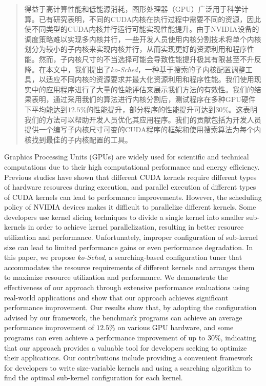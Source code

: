 

\begin{abstract}
  得益于高计算性能和低能源消耗，图形处理器（GPU）广泛用于科学计算。已有研究表明，不同的CUDA内核在执行过程中需要不同的资源，因此使不同类型的CUDA内核并行运行可能实现性能提升。由于NVIDIA设备的调度策略难以实现多内核并行，一些开发人员使用内核分割技术将单个内核划分为较小的子内核来实现内核并行，从而实现更好的资源利用和程序性能。然而，子内核尺寸的不当选择可能会导致性能提升极其有限甚至不升反降。在本文中，我们提出了\emph{ko-Sched}，一种基于搜索的子内核配置调整工具，以适应不同内核的资源要求并最大化资源利用和程序性能。我们使用现实中的应用程序进行了大量的性能评估来展示我们方法的有效性。我们的结果表明，通过采用我们的算法进行内核分割后，测试程序在多种GPU硬件下平均能达到$12.5\%$的性能提升，部分程序的性能提升可达到$30\%$。这表明我们的方法可以帮助开发人员优化其应用程序。我们的贡献包括为开发人员提供一个编写子内核尺寸可变的CUDA程序的框架和使用搜索算法为每个内核找到最佳的子内核配置的工具。
\end{abstract}

\begin{abstract*}
  Graphics Processing Units (GPUs) are widely used for scientific and technical computations due to their high computational performance and energy efficiency. Previous studies have shown that different CUDA kernels require different types of hardware resources during execution, and parallel execution of different types of CUDA kernels can lead to performance improvements. However, the scheduling policy of NVIDIA devices makes it difficult to parallelize different kernels. Some developers use kernel slicing techniques to divide a single kernel into smaller sub-kernels in order to achieve kernel parallelization, resulting in better resource utilization and performance. Unfortunately, improper configuration of sub-kernel size can lead to limited performance gains or even performance degradation. In this paper, we propose \emph{ko-Sched}, a searching-based configuration tuner that accommodates the resource requirements of different kernels and arranges them to maximize resource utilization and performance. We demonstrate the effectiveness of our approach through extensive performance evaluations using real-world applications and show that our approach achieves significant performance improvement. Our results show that, by adopting the configuration advised by our framework, the benchmark programs can achieve an average performance improvement of $12.5\%$ on various GPU hardware, and some programs can even achieve a performance improvement of up to $30\%$, indicating that our approach provides a valuable tool for developers seeking to optimize their applications. Our contributions include providing a convenient framework for developers to write size-variable kernels and using a searching algorithm to find the optimal sub-kernel configuration for each kernel. 
\end{abstract*}
